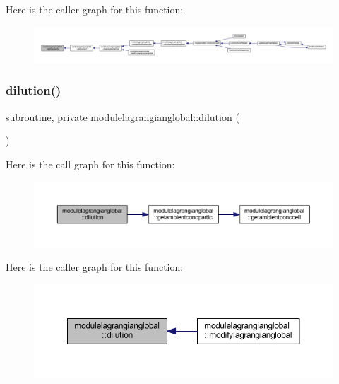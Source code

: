 Here is the caller graph for this function\+:\nopagebreak
\begin{figure}[H]
\begin{center}
\leavevmode
\includegraphics[width=350pt]{namespacemodulelagrangianglobal_af269f1bc18ee6db0ac6b2b6d27bc7499_icgraph}
\end{center}
\end{figure}
\mbox{\label{namespacemodulelagrangianglobal_aa64605bdb86dfab0e679be6775d4e80f}} 
\subsubsection{\texorpdfstring{dilution()}{dilution()}}
{\footnotesize\ttfamily subroutine, private modulelagrangianglobal\+::dilution (\begin{DoxyParamCaption}{ }\end{DoxyParamCaption})\hspace{0.3cm}{\ttfamily [private]}}

Here is the call graph for this function\+:\nopagebreak
\begin{figure}[H]
\begin{center}
\leavevmode
\includegraphics[width=350pt]{namespacemodulelagrangianglobal_aa64605bdb86dfab0e679be6775d4e80f_cgraph}
\end{center}
\end{figure}
Here is the caller graph for this function\+:\nopagebreak
\begin{figure}[H]
\begin{center}
\leavevmode
\includegraphics[width=350pt]{namespacemodulelagrangianglobal_aa64605bdb86dfab0e679be6775d4e80f_icgraph}
\end{center}
\end{figure}
\mbox{\label{namespacemodulelagrangianglobal_a2080e5fc3db1ae9253fe08012623e1bf}} 
